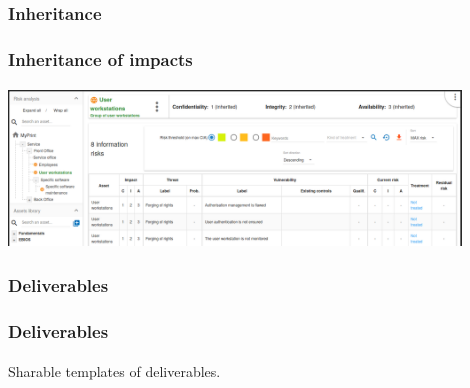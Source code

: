 \subsubsection{Inheritance}
\begin{frame}
    \frametitle{Inheritance of impacts}
    \framesubtitle{}
    \begin{center}
        \begin{center}
            \includegraphics[width=12cm]{./images/impacts-inheritance.png}
        \end{center}
    \end{center}
\end{frame}

\subsubsection{Deliverables}
\begin{frame}
    \frametitle{Deliverables}
    \framesubtitle{}
    Sharable templates of deliverables.
\end{frame}
